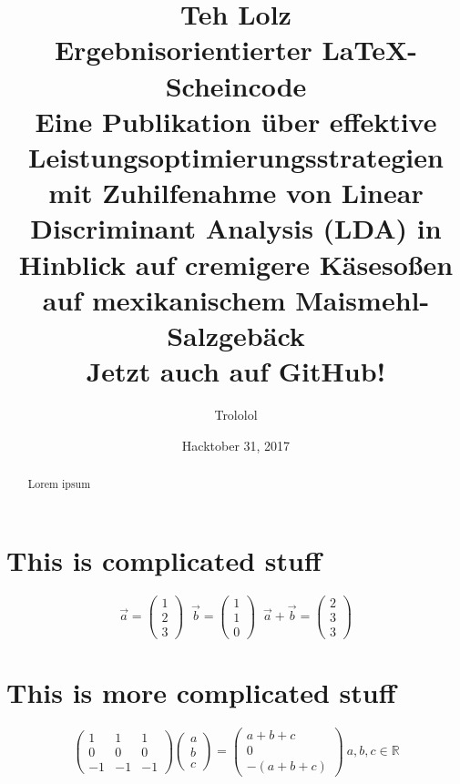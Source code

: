 \documentclass{article}
\author{Trololol}
\date{Hacktober 31, 2017}
\title{
    Teh Lolz\\
  \vspace{7mm}
    Ergebnisorientierter {\LaTeX}-Scheincode\\
  \vspace{5mm}
  \small {
    	Eine Publikation \"uber effektive Leistungsoptimierungsstrategien mit Zuhilfenahme von Linear Discriminant Analysis (LDA) in Hinblick auf cremigere K\"aseso\ss{}en auf mexikanischem Maismehl-Salzgeb\"ack\\
    }
  \vspace{1cm}
  \large {
        Jetzt auch auf GitHub!\\
      \vspace{1cm}
    }
}
\begin{document}
	\maketitle

	\thispagestyle{empty}
	\begin{abstract}
		Lorem ipsum
	\end{abstract}

	\newpage

	\section{This is complicated stuff}
	\begin{equation*}
		\vec{a} =
		\begin{pmatrix}
		1 \\
		2 \\
		3
		\end{pmatrix}\;\;
		\vec{b} =
		\begin{pmatrix}
		1 \\
		1 \\
		0
		\end{pmatrix}\;\;
		\vec{a} + \vec{b} = \begin{pmatrix}
		2 \\
		3 \\
		3
		\end{pmatrix}
	\end{equation*}

	\newpage

	\section{This is more complicated stuff}
	\begin{equation}
		\begin{pmatrix}
		1 & 1 & 1 \\
		0 & 0 & 0 \\
		-1 & -1 & -1
		\end{pmatrix}
		\begin{pmatrix}
		a \\
		b \\
		c
		\end{pmatrix} =
		\begin{pmatrix}
		a + b + c \\
		0 \\
		-(a + b + c)
		\end{pmatrix} \>
		a, b, c \in \mathbb{R}
	\end{equation}
\end{document}
